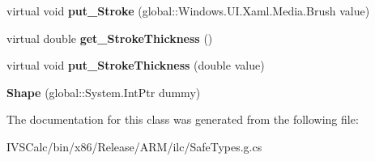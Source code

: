 \begin{DoxyCompactItemize}
\item 
\mbox{\label{class_windows_1_1_u_i_1_1_xaml_1_1_shapes_1_1_shape_a801ec283f413b3ba03d57ce8b2bccdc0}} 
virtual void {\bfseries put\+\_\+\+Stroke} (global\+::\+Windows.\+U\+I.\+Xaml.\+Media.\+Brush value)
\item 
\mbox{\label{class_windows_1_1_u_i_1_1_xaml_1_1_shapes_1_1_shape_a758d9f0e1b12c843580d28f3254f63ca}} 
virtual double {\bfseries get\+\_\+\+Stroke\+Thickness} ()
\item 
\mbox{\label{class_windows_1_1_u_i_1_1_xaml_1_1_shapes_1_1_shape_a3bfb547dd85a92a03c0f72a2ca6af30d}} 
virtual void {\bfseries put\+\_\+\+Stroke\+Thickness} (double value)
\item 
\mbox{\label{class_windows_1_1_u_i_1_1_xaml_1_1_shapes_1_1_shape_aef3c79f20646c23080a348eb29a0394e}} 
{\bfseries Shape} (global\+::\+System.\+Int\+Ptr dummy)
\end{DoxyCompactItemize}


The documentation for this class was generated from the following file\+:\begin{DoxyCompactItemize}
\item 
I\+V\+S\+Calc/bin/x86/\+Release/\+A\+R\+M/ilc/Safe\+Types.\+g.\+cs\end{DoxyCompactItemize}
